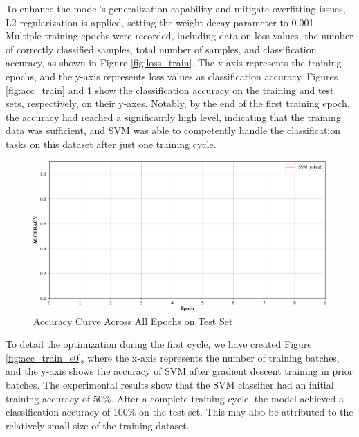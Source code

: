 \documentclass[twocolumn]{article}
\begin{document}
To enhance the model's generalization capability and mitigate overfitting issues, L2 regularization is applied, setting the weight decay parameter to 0.001. Multiple training epochs were recorded, including data on loss values, the number of correctly classified samples, total number of samples, and classification accuracy, as shown in Figure \ref{fig:loss_train}. The x-axis represents the training epochs, and the y-axis represents loss values as classification accuracy.
Figures \ref{fig:acc_train} and \ref{fig:acc_test} show the classification accuracy on the training and test sets, respectively, on their y-axes.
Notably, by the end of the first training epoch, the accuracy had reached a significantly high level, indicating that the training data was sufficient, and SVM was able to competently handle the classification tasks on this dataset after just one training cycle.

\begin{figure}[h]
	\centering
	\includegraphics[width=1.0\linewidth]{exp_log/train440_valid024/ACCURACY_test}
	\caption{Accuracy Curve Across All Epochs on Test Set}
	\label{fig:acc_test}
\end{figure}

To detail the optimization during the first cycle, we have created Figure \ref{fig:acc_train_e0}, where the x-axis represents the number of training batches, and the y-axis shows the accuracy of SVM after gradient descent training in prior batches. The experimental results show that the SVM classifier had an initial training accuracy of 50\%.
After a complete training cycle, the model achieved a classification accuracy of 100\% on the test set. This may also be attributed to the relatively small size of the training dataset.
\end{document}
